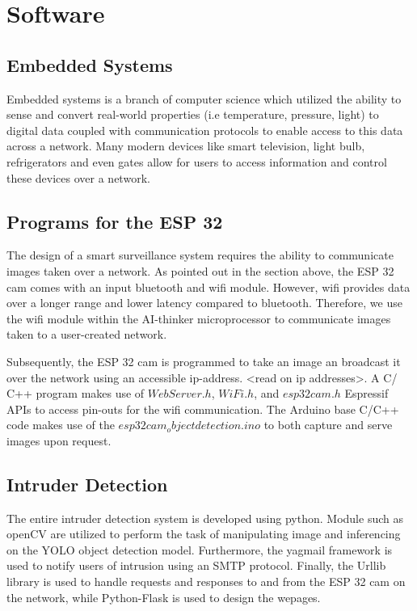 \documentclass[../../main.tex]{subfiles}
\begin{document}
    \section{Software}
        \subsection{Embedded Systems}
            Embedded systems is a branch of computer science which utilized the ability to sense and convert real-world properties (i.e temperature, pressure, light) to digital data coupled with communication protocols to enable access to this data across a network. Many modern devices like smart television, light bulb, refrigerators and even gates allow for users to access information and control these devices over a network.

            \subsection{Programs for the ESP 32}
                The design of a smart surveillance system requires the ability to communicate images taken over a network. As pointed out in the section above, the ESP 32 cam comes with an input bluetooth and wifi module. However, wifi provides data over a longer range and lower latency compared to bluetooth. Therefore, we use the wifi module within the AI-thinker microprocessor to communicate images taken to a user-created network.

                Subsequently, the ESP 32 cam is programmed to take an image an broadcast it over the network using an accessible ip-address. <read on ip addresses>. A C/ C++ program makes use of ${WebServer.h}$, ${WiFi.h}$, and ${esp32cam.h}$ Espressif APIs to access pin-outs for the wifi communication. The Arduino base C/C++ code makes use of the ${esp32cam_objectdetection.ino}$ to both capture and serve images upon request.
            
            \subsection{Intruder Detection}
                The entire intruder detection system is developed using python. Module such as openCV are utilized to perform the task of manipulating image and inferencing on the YOLO object detection model. Furthermore, the yagmail framework is used to notify users of intrusion using an SMTP protocol. Finally, the Urllib library is used to handle requests and responses to and from the ESP 32 cam on the network, while Python-Flask is used to design the wepages.
\end{document}
